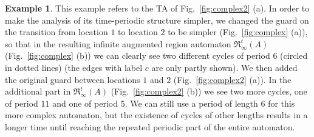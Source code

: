 \documentclass[11pt]{amsart}
\theoremstyle{definition}
\newtheorem{example}[theorem]{Example}
\newcommand{\IARRR}{\mathfrak{R}_{\infty}^{t}}
\begin{document}
\begin{example}
	This example refers to the TA of Fig.~\ref{fig:complex2} (a).
	In order to make the analysis of its time-periodic structure simpler, we changed the guard on the transition from location $1$ to location $2$ to be simpler (Fig.~\ref{fig:complex} (a)), so that in the resulting infinite augmented region automaton $\IARRR(A)$ (Fig.~\ref{fig:complex} (b)) we can clearly see two different cycles of period $6$ (circled in dotted lines) (the edges with label $c$ are only partly shown).
	We then added the original guard between locations $1$ and $2$ (Fig.~\ref{fig:complex2} (a)).
	In the additional part in $\IARRR(A)$ (Fig.~\ref{fig:complex2} (b)) we see two more cycles, one of period $11$ and one of period $5$.
	We can still use a period of length $6$ for this more complex automaton, but the existence of cycles of other lengths results in a longer time until reaching the repeated periodic part of the entire automaton.
\begin{figure}[t]
\centering
\end{figure}
\end{example}
\end{document}
